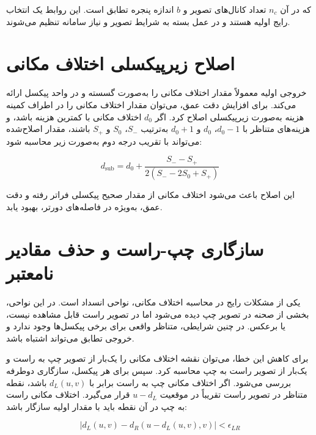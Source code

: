 که در آن \(n_c\) تعداد کانال‌های تصویر و \(b\) اندازه پنجره تطابق است. این روابط یک انتخاب رایج اولیه هستند و در عمل بسته به شرایط تصویر و نیاز سامانه تنظیم می‌شوند.

\section{اصلاح زیرپیکسلی اختلاف مکانی}

خروجی اولیه  معمولاً مقدار اختلاف مکانی را به‌صورت گسسته و در واحد پیکسل ارائه می‌کند. برای افزایش دقت عمق، می‌توان مقدار اختلاف مکانی را در اطراف کمینه هزینه به‌صورت زیرپیکسلی اصلاح کرد. اگر \(d_0\) اختلاف مکانی با کمترین هزینه باشد، و هزینه‌های متناظر با \(d_0-1\)، \(d_0\) و \(d_0+1\) به‌ترتیب \(S_{-}\)، \(S_0\) و \(S_{+}\) باشند، مقدار اصلاح‌شده می‌تواند با تقریب درجه دوم به‌صورت زیر محاسبه شود:

\begin{equation}
	d_{\mathrm{sub}}
	=
	d_0
	+
	\frac{
		S_{-}-S_{+}
	}{
		2(S_{-}-2S_0+S_{+})
	}
	\label{eq:subpixel_disparity}
\end{equation}

این اصلاح باعث می‌شود اختلاف مکانی از مقدار صحیح پیکسلی فراتر رفته و دقت عمق، به‌ویژه در فاصله‌های دورتر، بهبود یابد.

\section{سازگاری چپ-راست و حذف مقادیر نامعتبر}

یکی از مشکلات رایج در محاسبه اختلاف مکانی، نواحی انسداد%
است. در این نواحی، بخشی از صحنه در تصویر چپ دیده می‌شود اما در تصویر راست قابل مشاهده نیست، یا برعکس. در چنین شرایطی، متناظر واقعی برای برخی پیکسل‌ها وجود ندارد و خروجی تطابق می‌تواند اشتباه باشد.

برای کاهش این خطا، می‌توان نقشه اختلاف مکانی را یک‌بار از تصویر چپ به راست و یک‌بار از تصویر راست به چپ محاسبه کرد. سپس برای هر پیکسل، سازگاری دوطرفه بررسی می‌شود. اگر اختلاف مکانی چپ به راست برابر با \(d_L(u,v)\) باشد، نقطه متناظر در تصویر راست تقریباً در موقعیت \(u-d_L\) قرار می‌گیرد. اختلاف مکانی راست به چپ در آن نقطه باید با مقدار اولیه سازگار باشد:

\begin{equation}
	\left|
	d_L(u,v)
	-
	d_R(u-d_L(u,v),v)
	\right|
	<
	\epsilon_{LR}
	\label{eq:left_right_consistency}
\end{equation}

